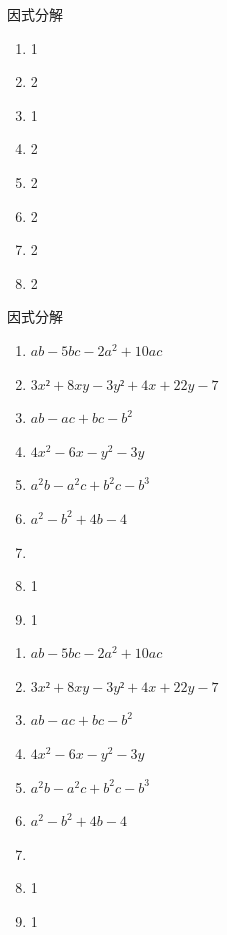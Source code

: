 \begin{homework}因式分解
    \begin{enumerate}
        \item 1
        \item 2
        \item 1
        \item 2
        \item 2
        \item 2
        \item 2
        \item 2
    \end{enumerate}

\end{homework}
\begin{homework}
    因式分解

    \begin{minipage}{0.45\textwidth}
         \begin{enumerate}
        \item \(ab-5bc-2a^2+10ac\)
        \item $3x²+8xy-3y²+4x+22y-7$
        \item \(ab-ac+bc-b^2\)
        \item \(4x^2-6x-y^2-3y\)
        \item \(a^2b-a^2c+b^2c-b^3\)
        \item \(a^2-b^2+4b-4\)
        \item \(\)
        \item 1
        \item 1
    \end{enumerate}
    \end{minipage}
    \hfill
    \begin{minipage}{0.45\textwidth}
        \begin{enumerate}
            \addtocounter{enumi}{+9}   
            \item \(ab-5bc-2a^2+10ac\)
            \item $3x²+8xy-3y²+4x+22y-7$
            \item \(ab-ac+bc-b^2\)
            \item \(4x^2-6x-y^2-3y\)
            \item \(a^2b-a^2c+b^2c-b^3\)
            \item \(a^2-b^2+4b-4\)
            \item \(\)
            \item 1
            \item 1
        \end{enumerate}
    \end{minipage}
   

\end{homework}
\begin{homework}

        
\end{homework}
\clearpage